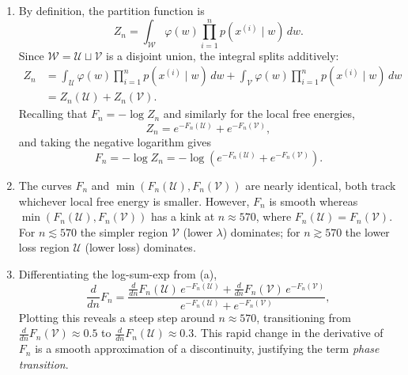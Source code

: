 \documentclass[11pt]{article}
\newcommand{\W}{\mathcal{W}}
\newcommand{\U}{\mathcal{U}}
\newcommand{\V}{\mathcal{V}}
\begin{document}
\begin{solution}
\begin{enumerate}
    \item
        By definition, the partition function is
        \begin{equation*}
            Z_n = \int_\W \varphi(w) \prod_{i=1}^n p(x^{(i)} \mid w)\, dw.
        \end{equation*}
        Since $\W = \U \sqcup \V$ is a disjoint union, the integral splits additively:
        \begin{align*}
            Z_n &= \int_\U \varphi(w) \prod_{i=1}^n p(x^{(i)} \mid w)\, dw
                + \int_\V \varphi(w) \prod_{i=1}^n p(x^{(i)} \mid w)\, dw \\
                &= Z_n(\U) + Z_n(\V).
        \end{align*}
        Recalling that $F_n = -\log Z_n$ and similarly for the local free energies,
        \begin{equation*}
            Z_n = e^{-F_n(\U)} + e^{-F_n(\V)},
        \end{equation*}
        and taking the negative logarithm gives
        \begin{equation*}
            F_n = -\log Z_n = -\log(e^{-F_n(\U)} + e^{-F_n(\V)}).
        \end{equation*}

    \item
        The curves $F_n$ and $\min(F_n(\U), F_n(\V))$ are nearly
        identical, both track whichever local free energy is smaller.
        However, $F_n$ is smooth whereas $\min(F_n(\U), F_n(\V))$ has a
        kink at $n \approx 570$, where $F_n(\U) = F_n(\V)$.
        For $n \lesssim 570$ the simpler region $\V$ (lower $\lambda$)
        dominates; for $n \gtrsim 570$ the lower loss region $\U$
        (lower loss) dominates.

    \item
        Differentiating the log-sum-exp from (a),
        \begin{equation*}
            \frac{d}{dn}F_n
            = \frac{\frac{d}{dn}F_n(\U)\,e^{-F_n(\U)} + \frac{d}{dn}F_n(\V)\,e^{-F_n(\V)}}
                   {e^{-F_n(\U)} + e^{-F_n(\V)}},
        \end{equation*}
        Plotting this reveals a steep step around
        $n \approx 570$, transitioning from $\frac{d}{dn}F_n(\V) \approx 0.5$ to
        $\frac{d}{dn}F_n(\U) \approx 0.3$. This rapid change in the derivative of
        $F_n$ is a smooth approximation of a discontinuity, justifying
        the term \emph{phase transition}.


\end{enumerate}
\end{solution}
\end{document}
